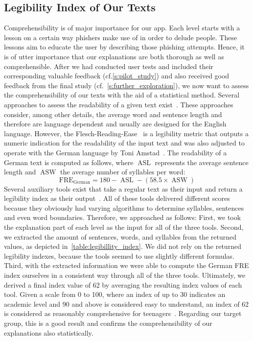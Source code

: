 \subsection{Legibility Index of Our Texts}
\label{s:legibility_index}
Comprehensibility is of major importance for our app. Each level starts with a lesson on a certain way phishers make use of in order to delude people. These lessons aim to educate the user by describing those phishing attempts. Hence, it is of utter importance that our explanations are both thorough as well as comprehensible. After we had conducted user tests and included their corresponding valuable feedback (cf.\autoref{s:pilot_study}) and also received good feedback from the final study (cf.~\autoref{s:further_exploration}), we now want to assess the comprehensibility of our texts with the aid of a statistical method. Several approaches to assess the readability of a given text exist~\cite{Gun,citeulike:7369187}. These approaches consider, among other details, the average word and sentence length and therefore are language dependent and usually are designed for the English language. However, the Flesch-Reading-Ease~\cite{citeulike:7369187} is a legibility metric that outputs a numeric indication for the readability of the input text and was also adjusted to operate with the German language by Toni Amstad~\cite{amstad1978verstandlich}. The readability of a German text is computed as follows, where $\operatorname{ASL}$ represents the average sentence length and $\operatorname{ASW}$ the average number of syllables per word:
$$\operatorname{FRE_{German}} = 180-\operatorname{ASL}-(58.5\times\operatorname{ASW})$$
Several auxiliary tools exist that take a regular text as their input and return a legibility index as their output~\cite{leichtlesbar, stilversprechend,fleschindexde}. All of these tools delivered different scores because they obviously had varying algorithms to determine syllables, sentences and even word boundaries.
Therefore, we approached as follows: First, we took the explanation part of each level as the input for all of the three tools. Second, we extracted the amount of sentences, words, and syllables from the returned values, as depicted in~\autoref{table:legibillity_index}. We did not rely on the returned legibility indexes, because the tools seemed to use slightly different formulas. Third, with the extracted information we were able to compute the German FRE index ourselves in a consistent way through all of the three tools. Ultimately, we derived a final index value of 62 by averaging the resulting index values of each tool. Given a scale from 0 to 100, where an index of up to 30 indicates an academic level and 90 and above is considered easy to understand, an index of 62 is considered as reasonably comprehensive for teenagers~\cite{amstad1978verstandlich}. Regarding our target group, this is a good result and confirms the comprehensibility of our explanations also statistically.

